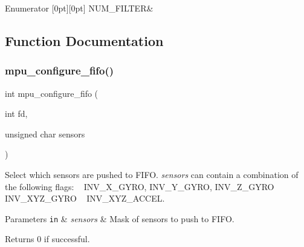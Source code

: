 \begin{DoxyEnumFields}{Enumerator}
[0pt][0pt]{}\mbox{\label{group___d_r_i_v_e_r_s_gga91c762a5bd71461f7911dc49ee7696e9a053f39f04904f6103090bcba3002c4a3}} 
N\+U\+M\+\_\+\+F\+I\+L\+T\+ER&\\
\hline

\end{DoxyEnumFields}


\subsection{Function Documentation}
\mbox{\label{group___d_r_i_v_e_r_s_gad5fa68be559e51761afaf20c2cf9ded6}} 
\subsubsection{mpu\+\_\+configure\+\_\+fifo()}
{\footnotesize\ttfamily int mpu\+\_\+configure\+\_\+fifo (\begin{DoxyParamCaption}\item[{int}]{fd,  }\item[{unsigned char}]{sensors }\end{DoxyParamCaption})}



Select which sensors are pushed to F\+I\+FO. {\itshape sensors} can contain a combination of the following flags\+: ~\newline
 I\+N\+V\+\_\+\+X\+\_\+\+G\+Y\+RO, I\+N\+V\+\_\+\+Y\+\_\+\+G\+Y\+RO, I\+N\+V\+\_\+\+Z\+\_\+\+G\+Y\+RO ~\newline
 I\+N\+V\+\_\+\+X\+Y\+Z\+\_\+\+G\+Y\+RO ~\newline
 I\+N\+V\+\_\+\+X\+Y\+Z\+\_\+\+A\+C\+C\+EL. 


\begin{DoxyParams}[1]{Parameters}
\mbox{\tt in}  & {\em sensors} & Mask of sensors to push to F\+I\+FO. \\
\hline
\end{DoxyParams}
\begin{DoxyReturn}{Returns}
0 if successful. 
\end{DoxyReturn}
\mbox{\label{group___d_r_i_v_e_r_s_gab6087a15ee23db23b6aec41590329a60}} 
